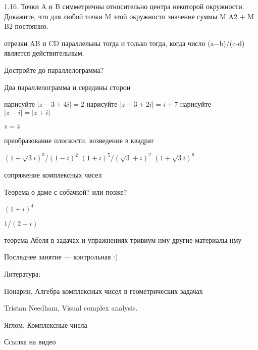 \documentclass[12pt,a4paper]{article}
\begin{document}
1.16. Точки A и B симметричны относительно центра некоторой окружности. Докажите, что для любой точки M этой окружности значение суммы M A2 + M B2 постоянно.




отрезки AB и CD параллельны тогда и только тогда,
когда число (a−b)/(c-d) является действительным.



Достройте до параллелограмма?


Два параллелограмма и середины сторон


нарисуйте $|z-3+4i|=2$
нарисуйте $|z-3+2i|=i+7$
нарисуйте $|z-i|=|z+i|$

$z=\bar{z}$

преобразование плоскости. 
возведение в квадрат

$(1+\sqrt{3}i)^3/(1-i)^2$
$(1+i)^5/(\sqrt{3}+i)^2$
$(1+\sqrt{3}i)^6$

сопряжение комплексных чисел




Теорема о даме с собачкой? или позже?



$(1+i)^4$


$1/(2-i)$

теорема Абеля в задачах и упражнениях
тривиум нму
другие материалы нму



Последнее занятие --- контрольная :)


Литература:

Понарин, Алгебра комплексных чисел в геометрических задачах

Tristan Needham, Visual complex analysis.

Яглом, Комплексные числа

Ссылка на видео
\end{document}
